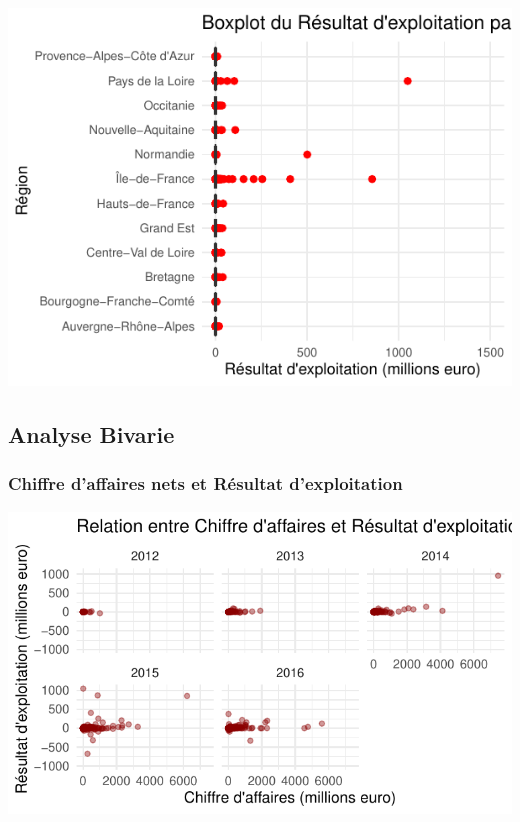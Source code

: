 \documentclass[mstat,12pt]{unswthesis}
\begin{document}
\includegraphics{scdon2-UPV-report-template_sansPython_files/figure-latex/resulta_graph_2015-1.pdf}

\newpage

\subsection{Analyse Bivarie}\label{analyse-bivarie}

\medskip

\subsubsection{Chiffre d'affaires nets et Résultat
d'exploitation}\label{chiffre-daffaires-nets-et-ruxe9sultat-dexploitation}

\includegraphics{scdon2-UPV-report-template_sansPython_files/figure-latex/nuage_point_anness-1.pdf}
\end{document}
